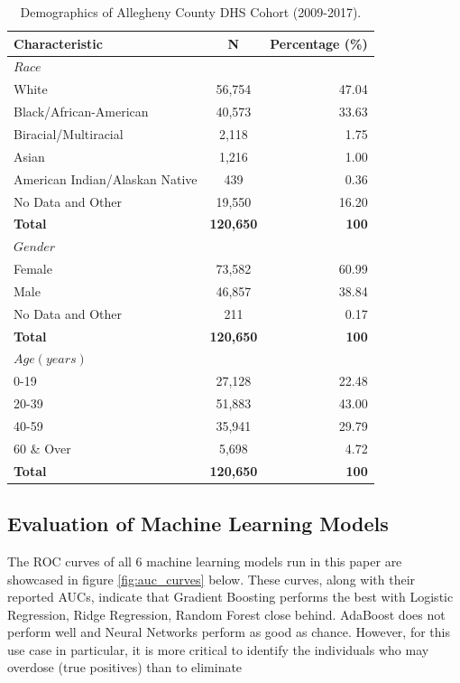 \documentclass[twoside,10.5pt]{article}
\begin{document}
\begin{table}[h!]
  \begin{center}
    \caption{Demographics of Allegheny County DHS Cohort (2009-2017).}
    \label{tab:table1}
    \begin{tabular}{l|c|r}
      \textbf{Characteristic} & \textbf{N} & \textbf{Percentage (\%)}\\
      \hline
      $Race$ & $ $ & $ $ \\
      White & 56,754 & 47.04\\
      Black/African-American & 40,573 & 33.63\\
      Biracial/Multiracial & 2,118 & 1.75\\
      Asian & 1,216 & 1.00\\
      American Indian/Alaskan Native & 439 & 0.36\\
      No Data and Other & 19,550 & 16.20\\
      \textbf{Total} & \textbf{120,650} & \textbf{100}\\
      \hline
      $Gender$ & $ $ & $ $ \\
      Female & 73,582 & 60.99\\
      Male & 46,857 & 38.84\\
      No Data and Other & 211 & 0.17\\
      \textbf{Total} & \textbf{120,650} & \textbf{100}\\
      \hline
      $Age (years)$ & $ $ & $ $\\
      0-19 & 27,128 & 22.48\\
      20-39 & 51,883 & 43.00\\
      40-59 & 35,941 &  29.79\\
      60 \& Over & 5,698 &   4.72\\
      \textbf{Total} & \textbf{120,650} & \textbf{100}\\
      \hline
    \end{tabular}
  \end{center}
\end{table}


\subsection{Evaluation of Machine Learning Models}
The ROC curves of all 6 machine learning models run in this paper are showcased in figure \ref{fig:auc_curves} below. These curves, along with their reported AUCs, indicate that Gradient Boosting performs the best with Logistic Regression, Ridge Regression, Random Forest close behind. AdaBoost does not perform well and Neural Networks perform as good as chance. However, for this use case in particular, it is more critical to identify the individuals who may overdose (true positives) than to eliminate  
\end{document}
